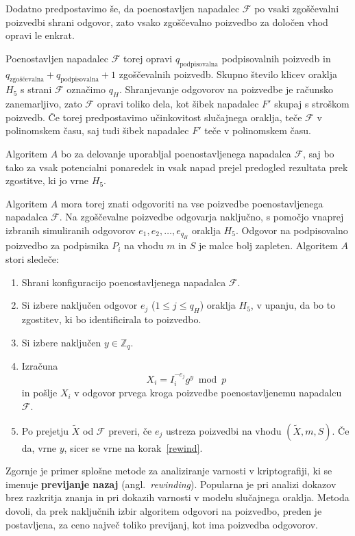 \documentclass[isrm2, tisk]{fmfdelo}
\newcommand{\Z}{\mathbb Z}
\begin{document}
Dodatno predpostavimo še, da poenostavljen napadalec $\mathcal{F}$ po vsaki zgoščevalni poizvedbi
shrani odgovor, zato vsako zgoščevalno poizvedbo za določen vhod opravi le enkrat. 

Poenostavljen napadalec $\mathcal{F}$ torej opravi $q_{\text{podpisovalna}}$ podpisovalnih poizvedb
in $q_{\text{zgoščevalna}} + q_{\text{podpisovalna}} + 1$ zgoščevalnih poizvedb. Skupno število
klicev oraklja $H_5$ s strani $\mathcal{F}$ označimo $q_H$. Shranjevanje odgovorov na poizvedbe je
računsko zanemarljivo, zato $\mathcal{F}$ opravi toliko dela, kot šibek napadalec $F'$ skupaj s
stroškom poizvedb. Če torej predpostavimo učinkovitost slučajnega oraklja, teče $\mathcal{F}$ v
polinomskem času, saj tudi šibek napadalec $F'$ teče v polinomskem času.

Algoritem $A$ bo za delovanje uporabljal poenostavljenega napadalca $\mathcal{F}$, saj bo tako za
vsak potencialni ponaredek in vsak napad prejel predogled rezultata prek zgostitve, ki jo vrne $H_5$.

Algoritem $A$ mora torej znati odgovoriti na vse poizvedbe poenostavljenega napadalca $\mathcal{F}$.
Na zgoščevalne poizvedbe odgovarja naključno, s pomočjo vnaprej izbranih simuliranih odgovorov $e_1,
e_2, \dots, e_{q_H}$ oraklja $H_5$. Odgovor na podpisovalno poizvedbo za podpisnika $P_i$ na vhodu
$m$ in $S$ je malce bolj zapleten. Algoritem $A$ stori sledeče:
\begin{enumerate}
    \item Shrani konfiguracijo poenostavljenega napadalca $\mathcal{F}$.
    \item \label{rewind} Si izbere naključen odgovor $e_j$ ($1 \le j \le q_H$) oraklja $H_5$, 
        v upanju, da bo to zgostitev, ki bo identificirala to poizvedbo.
    \item Si izbere naključen $y \in \Z_q$.
    \item Izračuna 
        $$
        X_i = I_i^{-e_j}g^y \bmod p
        $$
        in pošlje $X_i$ v odgovor prvega kroga poizvedbe poenostavljenemu napadalcu $\mathcal{F}$.
    \item Po prejetju $\tilde{X}$ od $\mathcal{F}$ preveri, če $e_j$ ustreza poizvedbi na vhodu
        $(\tilde{X}, m, S)$. Če da, vrne $y$, sicer se vrne na korak~\ref{rewind}.
\end{enumerate}
Zgornje je primer splošne metode za analiziranje varnosti v kriptografiji, ki se imenuje 
\textbf{previjanje nazaj} (angl.\ \textit{rewinding}). Popularna je pri analizi dokazov brez razkritja
znanja in pri dokazih varnosti v modelu slučajnega oraklja. Metoda dovoli, da prek naključnih izbir
algoritem odgovori na poizvedbo, preden je postavljena, za ceno največ toliko previjanj, kot ima
poizvedba odgovorov.
\end{document}
